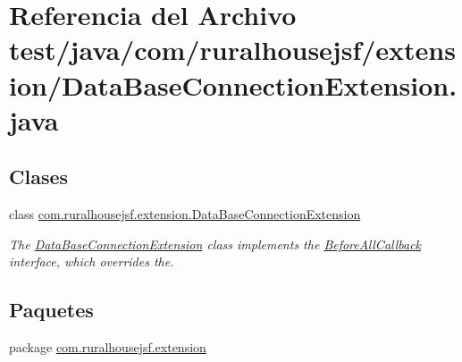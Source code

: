 \hypertarget{a00095}{}\section{Referencia del Archivo test/java/com/ruralhousejsf/extension/\+Data\+Base\+Connection\+Extension.java}
\label{a00095}
\subsection*{Clases}
\begin{DoxyCompactItemize}
\item 
class \mbox{\hyperlink{a00264}{com.\+ruralhousejsf.\+extension.\+Data\+Base\+Connection\+Extension}}
\begin{DoxyCompactList}\small\item\em The \mbox{\hyperlink{a00264}{Data\+Base\+Connection\+Extension}} class implements the \mbox{\hyperlink{}{Before\+All\+Callback}} interface, which overrides the. \end{DoxyCompactList}\end{DoxyCompactItemize}
\subsection*{Paquetes}
\begin{DoxyCompactItemize}
\item 
package \mbox{\hyperlink{a00124}{com.\+ruralhousejsf.\+extension}}
\end{DoxyCompactItemize}
